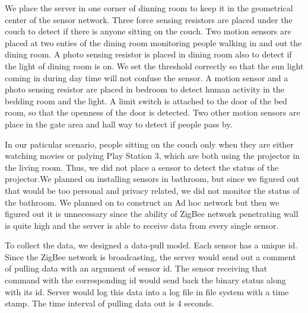 \documentclass[10pt, conference, compsocconf]{IEEEtran}
\begin{document}
We place the server in one corner of dinning room to keep it in the geometrical center of the sensor network. Three force sensing resistors are placed under the couch to detect if there is anyone sitting on the couch. Two motion sensors are placed at two enties of the dining room monitoring people walking in and out the dining room. A photo sensing resistor is placed in dining room also to detect if the light of dining room is on. We set the threshold correctly so that the sun light coming in during day time will not confuse the sensor. A motion sensor and a photo sensing resistor are placed in bedroom to detect human activity in the bedding room and the light. A limit switch is attached to the door of the bed room, so that the openness of the door is detected. Two other motion sensors are place in the gate area and hall way to detect if people pass by.

In our paticular scenario, people sitting on the couch only when they are either watching movies or palying Play Station 3, which are both using the projector in the living room. Thus, we did not place a sensor to detect the status of the projector.We planned on installing sensors in bathroom, but since we figured out that would be too personal and privacy related, we did not monitor the status of the bathroom. We planned on to construct an Ad hoc network but then we figured out it is unnecessary since the ability of ZigBee network penetrating wall is quite high and the server is able to receive data from every single sensor.

To collect the data, we designed a data-pull model. Each sensor has a unique id. Since the ZigBee network is broadcasting, the server would send out a comment of pulling data with an argument of sensor id. The sensor receiving that command with the corresponding id would send back the binary status along with its id. Server would log this data into a log file in file system with a time stamp. The time interval of pulling data out is 4 seconds.
\end{document}
